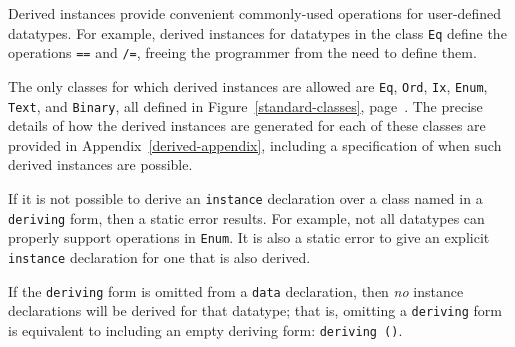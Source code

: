 Derived instances provide convenient commonly-used operations for
user-de\-fined da\-ta\-types.  For example, derived instances for datatypes
in the class \mbox{\tt Eq} define the operations \mbox{\tt ==} and \mbox{\tt /=}, freeing the
programmer from the need to define them.

The only classes for which derived instances are allowed are
\mbox{\tt Eq},
\mbox{\tt Ord}, 
\mbox{\tt Ix}, 
\mbox{\tt Enum}, 
\mbox{\tt Text}, and 
\mbox{\tt Binary},
all defined in Figure~\ref{standard-classes}, page~\pageref{standard-classes}.
The
precise details of how the derived instances are generated for each of
these classes are provided in Appendix~\ref{derived-appendix}, including
a specification of when such derived instances are possible. 

If it is not possible to derive an \mbox{\tt instance} declaration over a class
named in a \mbox{\tt deriving} form, then a static error results.  For example,
not all datatypes can properly support operations in \mbox{\tt Enum}.  It is
also a static error to give an explicit \mbox{\tt instance} declaration for
one that is also derived.

If the \mbox{\tt deriving} form is omitted from a \mbox{\tt data}
declaration, then {\em no} instance declarations will be derived for
that datatype; that is, omitting a \mbox{\tt deriving} form is equivalent to
including an empty deriving form: \mbox{\tt deriving\ ()}.



